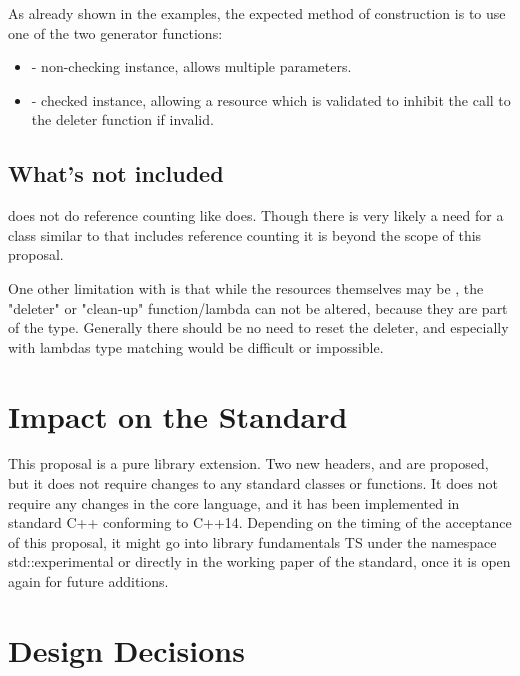 \documentclass[ebook,11pt,article]{memoir}
\begin{document}
As already shown in the examples, the expected method of construction is to use one of the two generator functions:
\begin{itemize}
\item {} - non-checking instance, allows multiple parameters.
\item {} - checked instance, allowing a resource which is validated to inhibit the call to the deleter function if invalid.
\end{itemize}

\section{What's not included}
 does not do reference counting like  does.  Though there is very likely a need for a class similar to  that includes reference counting it is beyond the scope of this proposal.

One other limitation with  is that while the resources themselves may be , the "deleter" or "clean-up" function/lambda can not be altered, because they are part of the type.  Generally there should be no need to reset the deleter, and especially with lambdas type matching would be difficult or impossible.

\chapter{Impact on the Standard}
This proposal is a pure library extension. Two new headers,  and  are proposed, but it does not require changes to any standard classes or functions. It does not require any changes in the core language, and it has been implemented in standard C++ conforming to C++14. Depending on the timing of the acceptance of this proposal, it might go into library fundamentals TS under the namespace std::experimental or directly in the working paper of the standard, once it is open again for future additions.

\chapter{Design Decisions}
\end{document}
